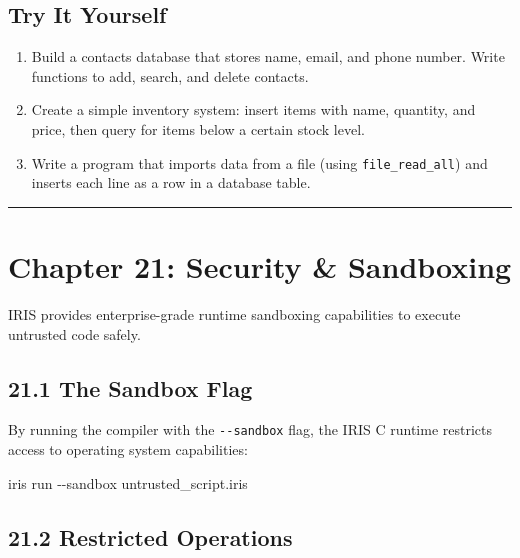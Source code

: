 \documentclass[
  english,
]{book}
\newenvironment{Shaded}{\begin{snugshade}}{\end{snugshade}}
\newcommand{\AttributeTok}[1]{\textcolor[rgb]{0.83,0.83,0.83}{#1}}
\newcommand{\ExtensionTok}[1]{\textcolor[rgb]{0.83,0.83,0.83}{#1}}
\newcommand{\NormalTok}[1]{\textcolor[rgb]{0.83,0.83,0.83}{#1}}
\providecommand{\tightlist}{%
  \setlength{\itemsep}{0pt}\setlength{\parskip}{0pt}}
\begin{document}
\subsection{Try It Yourself}\label{try-it-yourself-19}

\begin{enumerate}
\def\labelenumi{\arabic{enumi}.}
\tightlist
\item
  Build a contacts database that stores name, email, and phone number.
  Write functions to add, search, and delete contacts.
\item
  Create a simple inventory system: insert items with name, quantity,
  and price, then query for items below a certain stock level.
\item
  Write a program that imports data from a file (using
  \texttt{file\_read\_all}) and inserts each line as a row in a database
  table.
\end{enumerate}

\begin{center}\rule{0.5\linewidth}{0.5pt}\end{center}

\section{Chapter 21: Security \&
Sandboxing}\label{chapter-21-security-sandboxing}

IRIS provides enterprise-grade runtime sandboxing capabilities to
execute untrusted code safely.

\subsection{21.1 The Sandbox Flag}\label{the-sandbox-flag}

By running the compiler with the \texttt{-\/-sandbox} flag, the IRIS C
runtime restricts access to operating system capabilities:

\begin{Shaded}
\begin{Highlighting}[]
\ExtensionTok{iris}\NormalTok{ run }\AttributeTok{{-}{-}sandbox}\NormalTok{ untrusted\_script.iris}
\end{Highlighting}
\end{Shaded}

\subsection{21.2 Restricted Operations}\label{restricted-operations}
\end{document}
